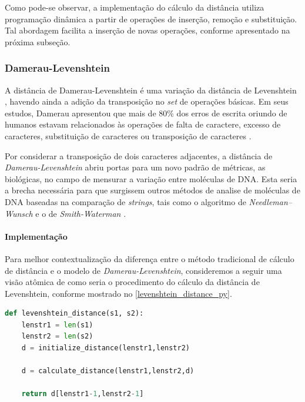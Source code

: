 Como pode-se observar, a implementação do cálculo da distância utiliza programação dinâmica a partir de operações de inserção, remoção e substituição. Tal abordagem facilita a inserção de novas operações, conforme apresentado na próxima subseção.

\subsubsection*{Damerau-Levenshtein} %
\label{sec:damerau_levenshtein}

A distância de Damerau-Levenshtein é uma variação da distância de Levenshtein \cite{levenshtein1965}, havendo ainda a adição da transposição no \textit{set} de operações básicas. Em seus estudos, Damerau apresentou que mais de $80\%$ dos erros de escrita oriundo de humanos estavam relacionados às operações de falta de caractere, excesso de caracteres, substituição de caracteres ou transposição de caracteres \cite{damerau1964technique}.


Por  considerar  a transposição de dois caracteres adjacentes, a distância de \textit{Damerau-Levenshtein} abriu portas para um novo padrão de métricas, as biológicas, no campo de mensurar a variação entre moléculas de DNA. Esta seria a brecha necessária para que surgissem outros métodos de analise de moléculas de DNA baseadas na comparação de \textit{strings}, tais como o algoritmo de \textit{Needleman–Wunsch} \cite{needleman1970general} e  o de \textit{Smith-Waterman} \cite{smith1981identification}.

\paragraph*{Implementação} %
\label{sub:implementa_damerau_levenshtein}

Para melhor contextualização da diferença entre o método tradicional de cálculo de distância e o modelo de \textit{Damerau-Levenshtein}, consideremos a seguir uma visão atômica de como seria o procedimento do cálculo da distância de Levenshtein, conforme mostrado no \autoref{levenshtein_distance_py}.

\begin{lstlisting}[language=Python,label=levenshtein_distance_py,caption={Visão atômica do cálculo da distância de Levenshtein}]
def levenshtein_distance(s1, s2):
    lenstr1 = len(s1)
    lenstr2 = len(s2)
    d = initialize_distance(lenstr1,lenstr2)

	d = calculate_distance(lenstr1,lenstr2,d) 

    return d[lenstr1-1,lenstr2-1]
\end{lstlisting}

